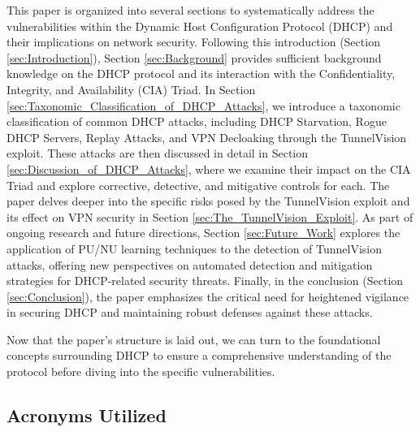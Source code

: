 \documentclass[conference]{IEEEtran}
\begin{document}
        This paper is organized into several sections to systematically address the vulnerabilities within the Dynamic Host Configuration Protocol (DHCP) and their implications on network security. Following this introduction (Section \ref{sec:Introduction}), Section \ref{sec:Background} provides sufficient background knowledge on the DHCP protocol and its interaction with the Confidentiality, Integrity, and Availability (CIA) Triad. In Section  \ref{sec:Taxonomic_Classification_of_DHCP_Attacks}, we introduce a taxonomic classification of common DHCP attacks, including DHCP Starvation, Rogue DHCP Servers, Replay Attacks, and VPN Decloaking through the TunnelVision exploit. These attacks are then discussed in detail in Section  \ref{sec:Discussion_of_DHCP_Attacks}, where we examine their impact on the CIA Triad and explore corrective, detective, and mitigative controls for each. The paper delves deeper into the specific risks posed by the TunnelVision exploit and its effect on VPN security in Section  \ref{sec:The_TunnelVision_Exploit}. As part of ongoing research and future directions, Section \ref{sec:Future_Work} explores the application of PU/NU learning techniques to the detection of TunnelVision attacks, offering new perspectives on automated detection and mitigation strategies for DHCP-related security threats. Finally, in the conclusion (Section  \ref{sec:Conclusion}), the paper emphasizes the critical need for heightened vigilance in securing DHCP and maintaining robust defenses against these attacks.

        Now that the paper's structure is laid out, we can turn to the foundational concepts surrounding DHCP to ensure a comprehensive understanding of the protocol before diving into the specific vulnerabilities.
    
    \subsection{Acronyms Utilized}
    \label{subsec:Acronyms_Utilized}
\end{document}
